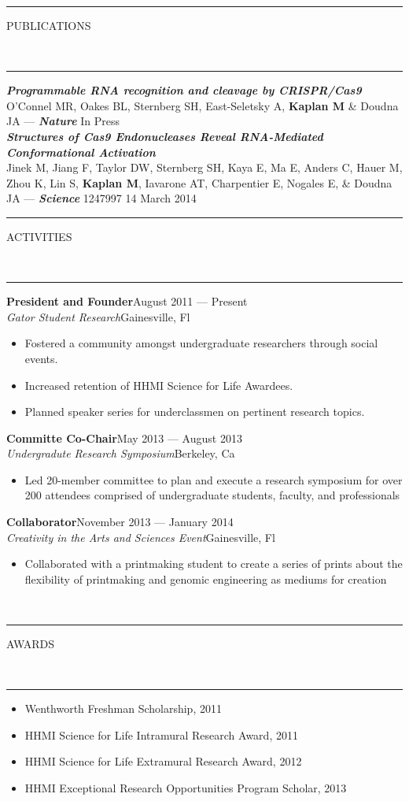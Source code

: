 \documentclass[10pt, letterpaper, oneside]{article}
\newcommand{\HRule}[2]{\textcolor{#1}{\rule{\linewidth}{#2}}}
\newcommand{\sectiontitle}[1]{\begin{minipage}{\textwidth}\HRule{black}{0.25mm}\vspace{-10pt}\begin{center}\large\MakeUppercase{#1}\end{center}\end{minipage}\vspace{-5pt}\\\HRule{light-grey}{0.15mm}\vspace{\baselineskip}}
\newenvironment{ressection}[1]{
  \sectiontitle{#1}}
  {\vspace{-\baselineskip}}
\newenvironment{tightressection}[1]{
  \begin{minipage}{\textwidth}
  \sectiontitle{#1}}
  {\vspace{\baselineskip}\end{minipage}}
\newenvironment{rescolumn}{
  \begin{minipage}{0.5\textwidth}
    \begin{itemize}[noitemsep,nolistsep]}
  {\end{itemize}
    \end{minipage}}
\newcommand{\resitem}[1]{
    \vspace{2pt}
    \item \begin{flushleft} #1 \end{flushleft}
}
\newcommand{\resentryheader}[4]{
    \vspace{-5pt}
    \textbf{#1}\hspace{\stretch{1}}\textcolor{light-grey}{#3}\\
    \textit{#2}\hspace{\stretch{1}}\textcolor{light-grey}{#4}\\
}
\newenvironment{resentry}[4]{
  \begin{minipage}{\textwidth}
    \resentryheader{#1}{#2}{#3}{#4}
        \vspace{-\baselineskip}
    \begin{itemize}[noitemsep,nolistsep]
}{
    \end{itemize}
        \vspace{\baselineskip}
        \end{minipage}
}
\begin{document}
\begin{tightressection}{publications}


{\em \bf Programmable RNA recognition and cleavage by CRISPR/Cas9\\}
 O'Connel MR, Oakes BL, Sternberg SH, East-Seletsky A, {\bf Kaplan M} \& Doudna JA --- {\it \textbf {Nature}} In Press \\

{\em \bf Structures of Cas9 Endonucleases Reveal RNA-Mediated Conformational Activation\\}
 Jinek M, Jiang F, Taylor DW, Sternberg SH, Kaya E, Ma E, Anders C, Hauer M, Zhou K, Lin S, {\bf Kaplan M}, Iavarone AT,  Charpentier E, Nogales E, \&  Doudna JA ---
{\it \textbf{Science}} 1247997 14 March 2014

\end{tightressection}

\begin{ressection}{Activities}
  \begin{resentry}{President and Founder}{Gator Student Research}{August 2011 --- Present}{Gainesville, Fl}
    \resitem{Fostered a community amongst  undergraduate researchers through social events.}
    \resitem{Increased retention of HHMI Science for Life Awardees.}
    \resitem{Planned speaker series for underclassmen on pertinent research topics.}
  \end{resentry}
 
  \begin{resentry}{Committe Co-Chair}{Undergradute Research Symposium}{May 2013 --- August 2013}{Berkeley, Ca}
    \resitem{Led 20-member committee to plan and execute a research symposium for over 200 attendees comprised of undergraduate students, faculty, and professionals}
   \end{resentry}

\begin{resentry}{Collaborator}{Creativity in the Arts and Sciences Event}{November 2013 --- January 2014}{Gainesville, Fl}
    \resitem{Collaborated with a printmaking student to create a series of prints about the flexibility of printmaking and genomic engineering as mediums for creation}
   \end{resentry}
 \\
\end{ressection}

     

\begin{tightressection}{awards}
  \begin{rescolumn}
      \resitem{Wenthworth Freshman Scholarship, 2011}
      \resitem{HHMI Science for Life Intramural Research Award, 2011}
    \end{rescolumn}
  \begin{rescolumn}
       \resitem{HHMI Science for Life Extramural Research Award, 2012}
      \resitem{HHMI Exceptional Research Opportunities Program Scholar, 2013}
    \end{rescolumn}
\end{tightressection}
\end{document}
